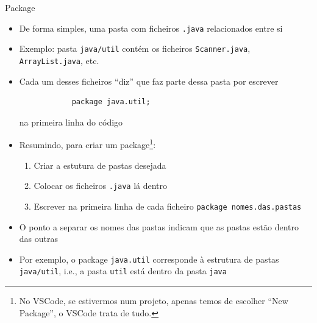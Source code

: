 \documentclass[portuguese, aspectratio=169, xcolor=table]{beamer}
\begin{document}
\begin{frame}[fragile]{Package}
    \begin{itemize}
        \item De forma simples, uma pasta com ficheiros \texttt{.java} relacionados entre si
        \item Exemplo: pasta \texttt{java/util} contém os ficheiros \texttt{Scanner.java}, \texttt{ArrayList.java}, etc.
        \item Cada um desses ficheiros ``diz'' que faz parte dessa pasta por escrever
        \begin{verbatim}
            package java.util;
        \end{verbatim}
        na primeira linha do código
        \item Resumindo, para criar um package\footnote{No VSCode, se estivermos num projeto, apenas temos de escolher ``New Package'', o VSCode trata de tudo.}:
        \begin{enumerate}
            \item Criar a estutura de pastas desejada
            \item Colocar os ficheiros \texttt{.java} lá dentro
            \item Escrever na primeira linha de cada ficheiro \texttt{package nomes.das.pastas}
        \end{enumerate}
        \item O ponto a separar os nomes das pastas indicam que as pastas estão dentro das outras
        \item Por exemplo, o package \texttt{java.util} corresponde à estrutura de pastas  \texttt{java/util}, i.e., a pasta \texttt{util} está dentro da pasta \texttt{java}
    \end{itemize}
\end{frame}
\end{document}
